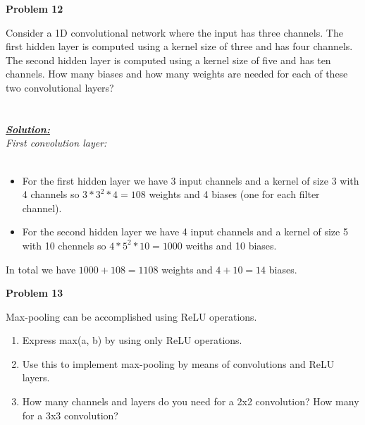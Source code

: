 \documentclass{article}
\begin{document}
\newpage
\noindent \textbf{Problem 12}

\noindent Consider a 1D convolutional network where the input has three channels. The first 
hidden layer is computed using a kernel size of three and has four channels. The second
hidden layer is computed using a kernel size of five and has ten channels. How many 
biases and how many weights are needed for each of these two convolutional layers? \\ \\ \\

\noindent \underline{\textbf{\textit{Solution:}}} \\ 

\noindent \textit{First convolution layer:} \\ \\

\begin{itemize}
  \item  For the first hidden layer we have 3 input channels and a kernel of size 3 with 4 channels so $3*3^2*4=108$ weights and 4 biases (one for each filter channel).
  \item  For the second hidden layer we have 4 input channels and a kernel of size 5 with 10 chennels so $4*5^2*10=1000$ weiths and 10 biases.
\end{itemize}
In total we have $1000+108=1108$ weights and $4+10=14$ biases.  



\newpage
\noindent \textbf{Problem 13}

\noindent Max-pooling can be accomplished using ReLU operations.
\begin{enumerate} [label=\Alph*]
    
    \item Express max(a, b) by using only ReLU operations.
    \item Use this to implement max-pooling by means of convolutions and ReLU layers.
    \item How many channels and layers do you need for a 2x2 convolution? How many for a 3x3 convolution?\\ \\ \\
\end{enumerate}\
\end{document}
